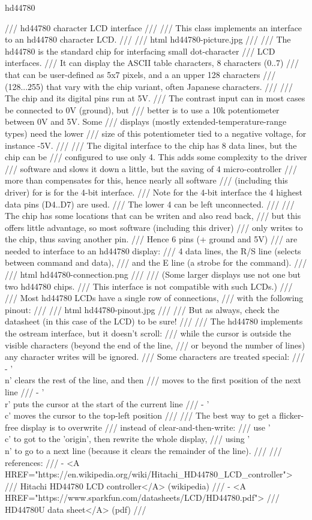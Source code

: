 hd44780

/// hd44780 character LCD interface
///
/// This class implements an interface to an hd44780 character LCD.
///
/// \image html hd44780-picture.jpg
///
/// The hd44780 is the standard chip for interfacing small dot-character
/// LCD interfaces.
/// It can display the ASCII table characters, 8 characters (0..7)
/// that can be user-defined as 5x7 pixels, and a an upper 128 characters
/// (128...255) that vary with the chip variant, often Japanese characters.
///
/// The chip and its digital pins run at 5V.
/// The contrast input can in most cases be connected to 0V (ground), but
/// better is to use a 10k potentiometer between 0V and 5V. Some
/// displays (mostly extended-temperature-range types) need the lower
/// size of this potentiometer tied to a negative voltage, for instance -5V.
///
/// The digital interface to the chip has 8 data lines, but the chip can be
/// configured to use only 4. This adds some complexity to the driver
/// software and slows it down a little, but the saving of 4 micro-controller
/// more than compensates for this, hence nearly all software
/// (including this driver) for is for the 4-bit interface.
/// Note for the 4-bit interface the 4 highest data pins (D4..D7) are used.
/// The lower 4 can be left unconnected.
///
/// The chip has some locations that can be writen and also read back,
/// but this offers little advantage, so most software (including this driver)
/// only writes to the chip, thus saving another pin.
/// Hence 6 pins (+ ground and 5V)
/// are needed to interface to an hd44780 display:
/// 4 data lines, the R/S line (selects between command and data),
/// and the E line (a strobe for the command).
///
/// \image html hd44780-connection.png
///
/// (Some larger displays use not one but two hd44780 chips.
/// This interface is not compatible with such LCDs.)
///
/// Most hd44780 LCDs have a single row of connections,
/// with the following pinout:
///
/// \image html hd44780-pinout.jpg
///
/// But as always, check the datasheet (in this case of the LCD) to be sure!
///
/// The hd44780 implements the ostream interface, but it doesn't scroll:
/// while the cursor is outside the visible characters (beyond the end of the line,
/// or beyond the number of lines) any character writes will be ignored.
/// Some characters are treated special:
///    - '\\n' clears the rest of the line, and then
///      moves to the first position of the next line
///    - '\\r' puts the cursor at the start of the current line
///    - '\\c' moves the cursor to the top-left position
///
/// The best way to get a flicker-free display is to overwrite
/// instead of clear-and-then-write:
/// use '\\c' to got to the 'origin', then rewrite the whole display,
/// using '\\n' to go to a next line (because it clears the remainder of the line).
///
/// references:
///    - <A HREF="https://en.wikipedia.org/wiki/Hitachi_HD44780_LCD_controller">
///       Hitachi HD44780 LCD controller</A> (wikipedia)
///    - <A HREF="https://www.sparkfun.com/datasheets/LCD/HD44780.pdf">
///       HD44780U data sheet</A> (pdf)
///

